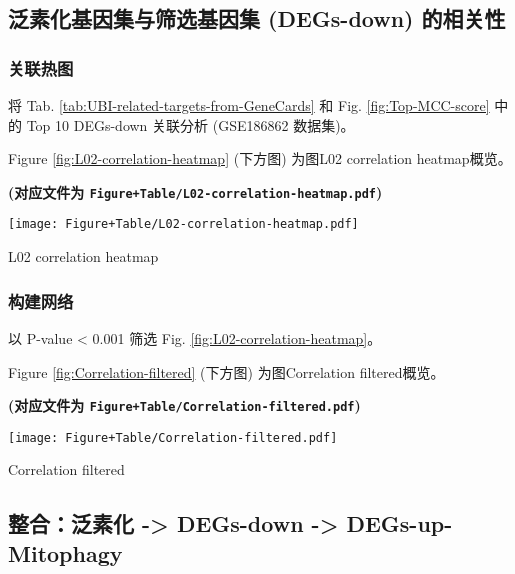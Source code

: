 \documentclass[
]{article}
\begin{document}
\hypertarget{ux6cdbux7d20ux5316ux57faux56e0ux96c6ux4e0eux7b5bux9009ux57faux56e0ux96c6-degs-down-ux7684ux76f8ux5173ux6027}{%
\subsection{泛素化基因集与筛选基因集 (DEGs-down) 的相关性}\label{ux6cdbux7d20ux5316ux57faux56e0ux96c6ux4e0eux7b5bux9009ux57faux56e0ux96c6-degs-down-ux7684ux76f8ux5173ux6027}}

\hypertarget{ux5173ux8054ux70edux56fe}{%
\subsubsection{关联热图}\label{ux5173ux8054ux70edux56fe}}

将 Tab. \ref{tab:UBI-related-targets-from-GeneCards} 和 Fig. \ref{fig:Top-MCC-score} 中的 Top 10 DEGs-down
关联分析 (GSE186862 数据集)。

Figure \ref{fig:L02-correlation-heatmap} (下方图) 为图L02 correlation heatmap概览。

\textbf{(对应文件为 \texttt{Figure+Table/L02-correlation-heatmap.pdf})}

\def\@captype{figure}
\begin{center}
\texttt{[image: Figure+Table/L02-correlation-heatmap.pdf]}
\caption{L02 correlation heatmap}\label{fig:L02-correlation-heatmap}
\end{center}

\hypertarget{ux6784ux5efaux7f51ux7edc}{%
\subsubsection{构建网络}\label{ux6784ux5efaux7f51ux7edc}}

以 P-value \textless{} 0.001 筛选 Fig. \ref{fig:L02-correlation-heatmap}。

Figure \ref{fig:Correlation-filtered} (下方图) 为图Correlation filtered概览。

\textbf{(对应文件为 \texttt{Figure+Table/Correlation-filtered.pdf})}

\def\@captype{figure}
\begin{center}
\texttt{[image: Figure+Table/Correlation-filtered.pdf]}
\caption{Correlation filtered}\label{fig:Correlation-filtered}
\end{center}

\hypertarget{ux6574ux5408ux6cdbux7d20ux5316---degs-down---degs-up-mitophagy}{%
\subsection{整合：泛素化 -\textgreater{} DEGs-down -\textgreater{} DEGs-up-Mitophagy}\label{ux6574ux5408ux6cdbux7d20ux5316---degs-down---degs-up-mitophagy}}
\end{document}
